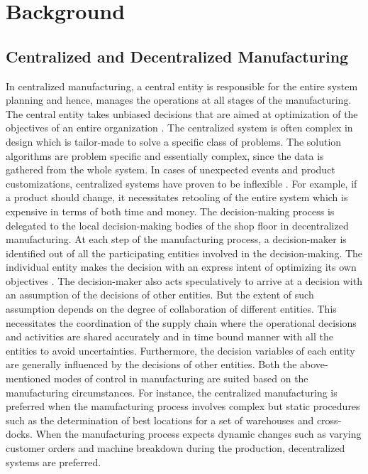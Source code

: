 \documentclass[10pt,conference,compsocconf]{IEEEtran}
\begin{document}
\section{Background}
\subsection{Centralized and Decentralized Manufacturing}
In centralized manufacturing, a central entity is responsible for the entire system planning and hence, manages the operations at all stages of the manufacturing. The central entity takes unbiased decisions that are aimed at optimization of the objectives of an entire organization \cite{Saharidis_Dallery:2006:Centralized_versus}. The centralized system is often complex in design which is tailor-made to solve a specific class of problems. The solution algorithms are problem specific and essentially complex, since the data is gathered from the whole system. In cases of unexpected events and product customizations, centralized systems have proven to be inflexible \cite{Saharidis_Dallery:2006:Centralized_versus}. For example, if a product should change, it necessitates retooling of the entire system which is expensive in terms of both time and money. The decision-making process is delegated to the local decision-making bodies of the shop floor in decentralized manufacturing. At each step of the manufacturing process, a decision-maker is identified out of all the participating entities involved in the decision-making. The individual entity makes the decision with an express intent of optimizing its own objectives \cite{Marques_Agostinho:2016:An_Architecture}. The decision-maker also acts speculatively to arrive at a decision with an assumption of the decisions of other entities. But the extent of such assumption depends on the degree of collaboration of different entities. This necessitates the coordination of the supply chain where the operational decisions and activities are shared accurately and in time bound manner with all the entities to avoid uncertainties. Furthermore, the decision variables of each entity are generally influenced by the decisions of other entities\cite{Hong_Ammons:2008:Centralized_Versus}. Both the above-mentioned modes of control in manufacturing are suited based on the manufacturing circumstances. For instance, the centralized manufacturing is preferred when the manufacturing process involves complex but static procedures \cite{Anderson_Bartholdi:2000:Centralized_Vs} such as the determination of best locations for a set of warehouses and cross-docks. When the manufacturing process expects dynamic changes such as varying customer orders and machine breakdown during the production, decentralized systems are preferred.
\end{document}
